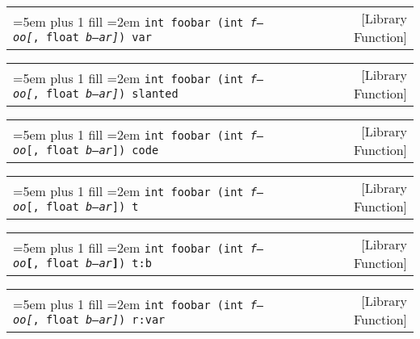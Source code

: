 \documentclass{book}
\newcommand\GNUTexinfocommandstyletextvar[1]{{\normalfont{}\textsl{#1}}}%
\begin{document}
%

\noindent\begin{tabularx}{\linewidth}{@{}Xr}
\rightskip=5em plus 1 fill
\hangindent=2em
\texttt{int foobar (int\ \GNUTexinfocommandstyletextvar{f---oo}\GNUTexinfocommandstyletextvar{[},\ float\ \GNUTexinfocommandstyletextvar{b--ar}\GNUTexinfocommandstyletextvar{]})\ var}& [Library Function]
\end{tabularx}

%

\noindent\begin{tabularx}{\linewidth}{@{}Xr}
\rightskip=5em plus 1 fill
\hangindent=2em
\texttt{int foobar (int\ \GNUTexinfocommandstyletextvar{f---oo}\textsl{[},\ float\ \GNUTexinfocommandstyletextvar{b--ar}\textsl{]})\ slanted}& [Library Function]
\end{tabularx}

%

\noindent\begin{tabularx}{\linewidth}{@{}Xr}
\rightskip=5em plus 1 fill
\hangindent=2em
\texttt{int foobar (int\ \GNUTexinfocommandstyletextvar{f---oo}\texttt{[},\ float\ \GNUTexinfocommandstyletextvar{b--ar}\texttt{]})\ code}& [Library Function]
\end{tabularx}

%

\noindent\begin{tabularx}{\linewidth}{@{}Xr}
\rightskip=5em plus 1 fill
\hangindent=2em
\texttt{int foobar (int\ \GNUTexinfocommandstyletextvar{f---oo}\texttt{[},\ float\ \GNUTexinfocommandstyletextvar{b--ar}\texttt{]})\ t}& [Library Function]
\end{tabularx}

%

\noindent\begin{tabularx}{\linewidth}{@{}Xr}
\rightskip=5em plus 1 fill
\hangindent=2em
\texttt{int foobar (int\ \GNUTexinfocommandstyletextvar{f---oo}\texttt{\textbf{[}},\ float\ \GNUTexinfocommandstyletextvar{b--ar}\texttt{\textbf{]}})\ t:b}& [Library Function]
\end{tabularx}

%

\noindent\begin{tabularx}{\linewidth}{@{}Xr}
\rightskip=5em plus 1 fill
\hangindent=2em
\texttt{int foobar (int\ \GNUTexinfocommandstyletextvar{f---oo}\textnormal{\GNUTexinfocommandstyletextvar{[}},\ float\ \GNUTexinfocommandstyletextvar{b--ar}\textnormal{\GNUTexinfocommandstyletextvar{]}})\ r:var}& [Library Function]
\end{tabularx}
\end{document}

